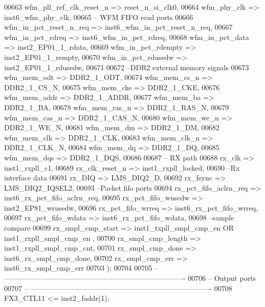 \begin{DoxyCode}
00663       wfm_pll_ref_clk_reset_n => reset_n_si_clk0,    
00664       wfm_phy_clk             => inst6_wfm_phy_clk,
00665 \textcolor{keyword}{         -- WFM FIFO read ports}
00666       wfm_in_pct_reset_n_req  => inst6_wfm_in_pct_reset_n_req,
00667       wfm_in_pct_rdreq        => inst6_wfm_in_pct_rdreq, 
00668       wfm_in_pct_data         => inst2_EP01_1_rdata,
00669       wfm_in_pct_rdempty      => inst2_EP01_1_rempty,
00670       wfm_in_pct_rdusedw      => inst2_EP01_1_rdusedw,
00671 
00672 \textcolor{keyword}{      --DDR2 external memory signals}
00673       wfm_mem_odt             => DDR2_1_ODT,
00674       wfm_mem_cs_n            => DDR2_1_CS_N,
00675       wfm_mem_cke             => DDR2_1_CKE,
00676       wfm_mem_addr            => DDR2_1_ADDR,
00677       wfm_mem_ba              => DDR2_1_BA,
00678       wfm_mem_ras_n           => DDR2_1_RAS_N,
00679       wfm_mem_cas_n           => DDR2_1_CAS_N,
00680       wfm_mem_we_n            => DDR2_1_WE_N,
00681       wfm_mem_dm              => DDR2_1_DM,
00682       wfm_mem_clk             => DDR2_1_CLK,
00683       wfm_mem_clk_n           => DDR2_1_CLK_N,
00684       wfm_mem_dq              => DDR2_1_DQ,
00685       wfm_mem_dqs             => DDR2_1_DQS,
00686       
00687 \textcolor{keyword}{      -- RX path}
00688       rx_clk                  => inst1_rxpll_c1,
00689       rx_clk_reset_n          => inst1_rxpll_locked,
00690 \textcolor{keyword}{      --Rx interface data }
00691       rx_DIQ                  => LMS_DIQ2_D,
00692       rx_fsync                => LMS_DIQ2_IQSEL2,
00693 \textcolor{keyword}{      --Packet fifo ports}
00694       rx_pct_fifo_aclrn_req   => inst6_rx_pct_fifo_aclrn_req,
00695       rx_pct_fifo_wusedw      => inst2_EP81_wrusedw,
00696       rx_pct_fifo_wrreq       => inst6_rx_pct_fifo_wrreq,
00697       rx_pct_fifo_wdata       => inst6_rx_pct_fifo_wdata,
00698 \textcolor{keyword}{      --sample compare}
00699       rx_smpl_cmp_start       => inst1\_txpll\_smpl\_cmp\_en \textcolor{keywordflow}{OR} inst1\_rxpll\_smpl\_cmp\_en  ,
00700       rx_smpl_cmp_length      => inst1_rxpll_smpl_cmp_cnt,
00701       rx_smpl_cmp_done        => inst6_rx_smpl_cmp_done,
00702       rx_smpl_cmp_err         => inst6_rx_smpl_cmp_err     
00703    \textcolor{vhdlchar}{)};
00704    
00705 \textcolor{keyword}{-- ----------------------------------------------------------------------------}
00706 \textcolor{keyword}{-- Output ports}
00707 \textcolor{keyword}{-- ----------------------------------------------------------------------------}
00708    \textcolor{vhdlchar}{FX3_CTL11}         \textcolor{vhdlchar}{<=} \textcolor{vhdlchar}{inst2_faddr}\textcolor{vhdlchar}{(}\textcolor{vhdllogic}{}\textcolor{vhdllogic}{1}\textcolor{vhdlchar}{)};

\end{DoxyCode}
